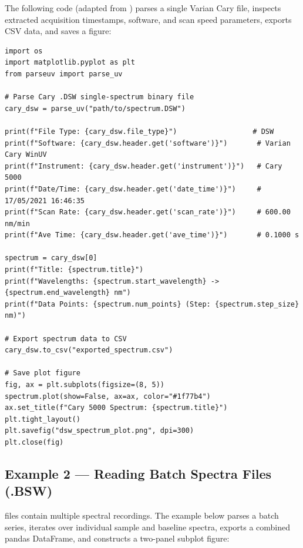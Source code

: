 \documentclass[11pt,a4paper]{article}
\newcommand{\code}[1]{\texttt{\detokenize{#1}}}
\begin{document}
The following code (adapted from \code{examples/demo.py}) parses a single Varian Cary \code{.DSW} file, inspects extracted acquisition timestamps, software, and scan speed parameters, exports CSV data, and saves a figure:

\begin{lstlisting}
import os
import matplotlib.pyplot as plt
from parseuv import parse_uv

# Parse Cary .DSW single-spectrum binary file
cary_dsw = parse_uv("path/to/spectrum.DSW")

print(f"File Type: {cary_dsw.file_type}")                  # DSW
print(f"Software: {cary_dsw.header.get('software')}")       # Varian Cary WinUV
print(f"Instrument: {cary_dsw.header.get('instrument')}")   # Cary 5000
print(f"Date/Time: {cary_dsw.header.get('date_time')}")     # 17/05/2021 16:46:35
print(f"Scan Rate: {cary_dsw.header.get('scan_rate')}")     # 600.00 nm/min
print(f"Ave Time: {cary_dsw.header.get('ave_time')}")       # 0.1000 s

spectrum = cary_dsw[0]
print(f"Title: {spectrum.title}")
print(f"Wavelengths: {spectrum.start_wavelength} -> {spectrum.end_wavelength} nm")
print(f"Data Points: {spectrum.num_points} (Step: {spectrum.step_size} nm)")

# Export spectrum data to CSV
cary_dsw.to_csv("exported_spectrum.csv")

# Save plot figure
fig, ax = plt.subplots(figsize=(8, 5))
spectrum.plot(show=False, ax=ax, color="#1f77b4")
ax.set_title(f"Cary 5000 Spectrum: {spectrum.title}")
plt.tight_layout()
plt.savefig("dsw_spectrum_plot.png", dpi=300)
plt.close(fig)
\end{lstlisting}

\subsection{Example 2 — Reading Batch Spectra Files (.BSW)}

\code{.BSW} files contain multiple spectral recordings. The example below parses a batch series, iterates over individual sample and baseline spectra, exports a combined pandas DataFrame, and constructs a two-panel subplot figure:
\end{document}

